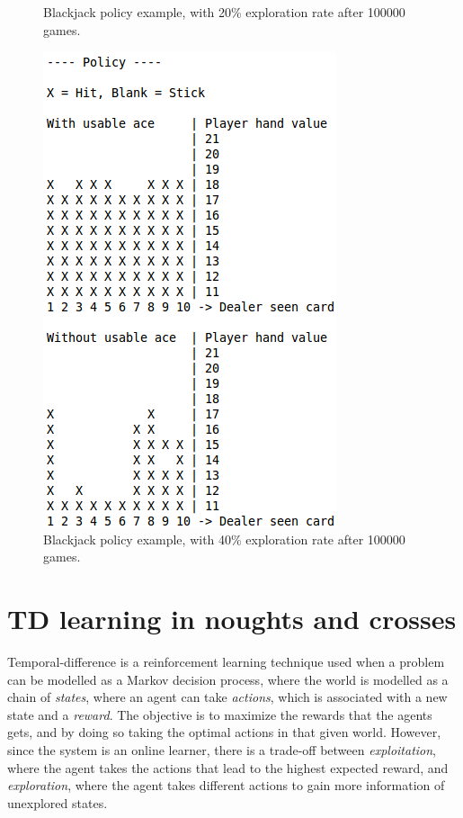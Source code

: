 \documentclass[12pt]{article}
\begin{document}
\begin{figure}[htbp!]
\begin{minipage}[t]{0.3\linewidth}
	\caption{Blackjack policy example, with 20\% exploration rate after 100000 games.}
	\label{fig:blackjack_0_2_Q}
\end{minipage}
\quad
\begin{minipage}[t]{0.3\linewidth}
	\includegraphics[scale=0.35]{images/blackjack_0_4_Q}
	\caption{Blackjack policy example, with 40\% exploration rate after 100000 games.}
	\label{fig:blackjack_0_4_Q}
\end{minipage}
\end{figure}

\section{TD learning in noughts and crosses}

Temporal-difference is a reinforcement learning technique used when a problem can be modelled as a Markov decision process, where the world is modelled as a chain of \emph{states}, where an agent can take \emph{actions}, which is associated with a new state and a \emph{reward}.
The objective is to maximize the rewards that the agents gets, and by doing so taking the optimal actions in that given world.
However, since the system is an online learner, there is a trade-off between \emph{exploitation}, where the agent takes the actions that lead to the highest expected reward, and \emph{exploration}, where the agent takes different actions to gain more information of unexplored states.
\end{document}
